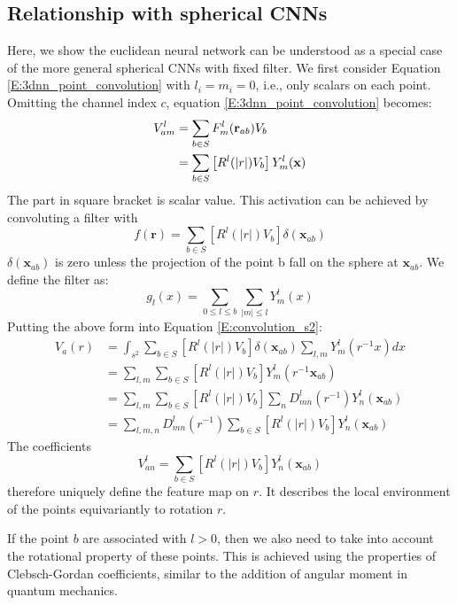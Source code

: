 \documentclass{IEEEtran}
\begin{document}
\subsection*{Relationship with spherical CNNs}
Here, we show the euclidean neural network can be understood as a special case of the more general spherical CNNs 
with fixed filter.
We first consider Equation \eqref{E:3dnn_point_convolution} with $l_i=m_i=0$, i.e., only scalars on each point. 
Omitting the channel index $c$, 
equation \eqref{E:3dnn_point_convolution} becomes:
\begin{align}
    V_{am}^{l} &= \sum_{b \in S} F_{m}^{l}(\mathbf{r}_{ab}) V_{b}  \notag\\
            &= \sum_{b \in S} \left[R^{l} (|r|)V_{b}\right] Y_{m}^{l}(\mathbf{x})
\end{align}
The part in square bracket is scalar value. This activation can be achieved by convoluting a filter with
\begin{equation}
    f(\mathbf{r}) = \sum_{b \in S} \left[R^{l} (|r|)V_{b}\right] \delta(\mathbf{x}_{ab})
\end{equation}
$\delta(\mathbf{x}_{ab})$ is zero unless the projection of the point b fall on the sphere at $\mathbf{x}_{ab}$. 
We define the filter as:
\begin{equation}
    g_l(x) = \sum_{0\leq l \leq b} \sum_{|m|\leq l} Y_m^l(x)
\end{equation}
Putting the above form into Equation \eqref{E:convolution_s2}:
\begin{align*}
    V_a (r) &= \int_{s^2} \sum_{b \in S} \left[R^{l} (|r|)V_{b}\right] \delta(\mathbf{x}_{ab}) \sum_{l,m} Y_m^l(r^{-1}x) dx \\
    &= \sum_{l,m} \sum_{b \in S} \left[R^{l} (|r|)V_{b}\right] Y_m^l(r^{-1}\mathbf{x}_{ab}) \\
    &= \sum_{l,m} \sum_{b \in S} \left[R^{l} (|r|)V_{b}\right] \sum_n D_{mn}^l(r^{-1}) Y_n^l(\mathbf{x}_{ab}) \\
    &= \sum_{l,m,n} D_{mn}^l(r^{-1}) \sum_{b \in S} \left[R^{l} (|r|)V_{b}\right] Y_n^l(\mathbf{x}_{ab})
\end{align*}
The coefficients \[V_{an}^l = \sum_{b \in S} \left[R^{l} (|r|)V_{b}\right] Y_n^l(\mathbf{x}_{ab})\] therefore uniquely define 
the feature map on $r$. It describes the local environment of the points equivariantly to rotation $r$.

If the point $b$ are associated with $l>0$, then we also need to take into account the rotational property of these points. This is 
achieved using the properties of Clebsch-Gordan coefficients, similar to the addition of angular moment in quantum mechanics.
\end{document}
